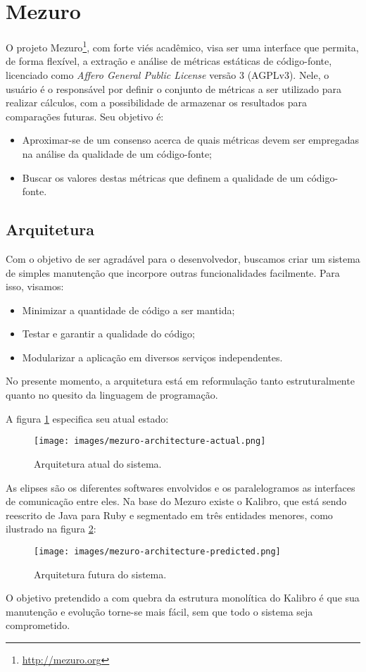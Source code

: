 \documentclass[12pt]{article}
\begin{document}
\section{Mezuro}
O projeto Mezuro\footnote{\url{http://mezuro.org}}, com forte viés acadêmico, visa ser uma interface que permita, de forma flexível, a extração e análise de métricas estáticas de código-fonte, licenciado como \textit{Affero General Public License} versão 3 (AGPLv3). Nele, o usuário é o responsável por definir o conjunto de métricas a ser utilizado para realizar cálculos, com a possibilidade de armazenar os resultados para comparações futuras. Seu objetivo é:
\begin{itemize}
    \item Aproximar-se de um consenso acerca de quais métricas devem ser empregadas na análise da qualidade de um código-fonte;
    \item Buscar os valores destas métricas que definem a qualidade de um código-fonte.
\end{itemize}

  \subsection{Arquitetura}
  Com o objetivo de ser agradável para o desenvolvedor, buscamos criar um sistema de simples manutenção que incorpore outras funcionalidades facilmente. Para isso, visamos:
  \begin{itemize}
    \item Minimizar a quantidade de código a ser mantida;
    \item Testar e garantir a qualidade do código;
    \item Modularizar a aplicação em diversos serviços independentes.
  \end{itemize}

  No presente momento, a arquitetura está em reformulação tanto estruturalmente quanto no quesito da linguagem de programação.

  A figura \ref{fig:architecture-1} especifica seu atual estado:
  \begin{figure}[H]
    \centering
    \texttt{[image: images/mezuro-architecture-actual.png]}
    \caption{Arquitetura atual do sistema.}
    \label{fig:architecture-1}
  \end{figure}
  As elipses são os diferentes softwares envolvidos e os paralelogramos as interfaces de comunicação entre eles. Na base do Mezuro existe o Kalibro, que está sendo reescrito
  de Java para Ruby e segmentado em três entidades menores, como ilustrado na figura \ref{fig:architecture-2}:
  \begin{figure}[H]
    \centering
      \texttt{[image: images/mezuro-architecture-predicted.png]}
    \caption{Arquitetura futura do sistema.}
    \label{fig:architecture-2}
  \end{figure}
  O objetivo pretendido a com quebra da estrutura monolítica do Kalibro é que sua manutenção e evolução torne-se mais fácil, sem que todo o sistema seja comprometido.
\end{document}
